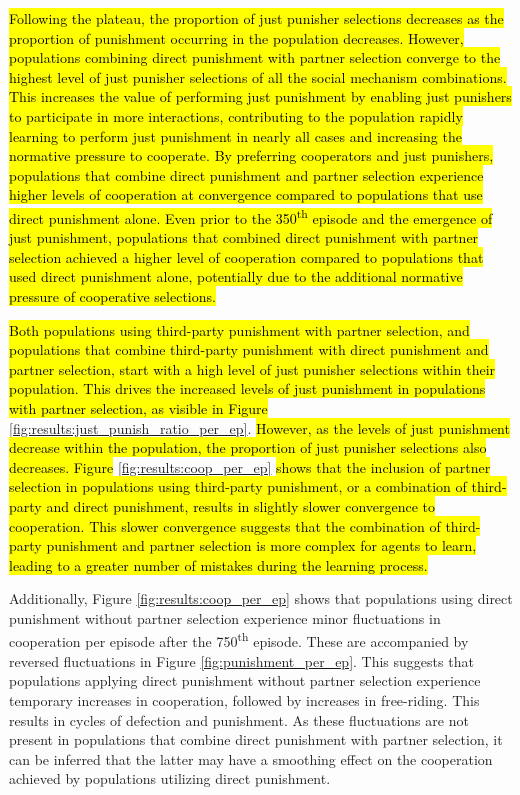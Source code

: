 \documentclass[sn-aps,numbered]{sn-jnl}%
\theoremstyle{thmstyleone}%
\theoremstyle{thmstyletwo}%
\theoremstyle{thmstylethree}%
\begin{document}
\hl{Following the plateau, the proportion of just punisher selections decreases as the proportion of punishment occurring in the population decreases. However, populations combining direct punishment with partner selection converge to the highest level of just punisher selections of all the social mechanism combinations. This increases the value of performing just punishment by enabling just punishers to participate in more interactions, contributing to the population rapidly learning to perform just punishment in nearly all cases and increasing the normative pressure to cooperate. By preferring cooperators and just punishers, populations that combine direct punishment and partner selection experience higher levels of cooperation at convergence compared to populations that use direct punishment alone. Even prior to the 350\textsuperscript{th} episode and the emergence of just punishment, populations that combined direct punishment with partner selection achieved a higher level of cooperation compared to populations that used direct punishment alone, potentially due to the additional normative pressure of cooperative selections.} 

\hl{Both populations using third-party punishment with partner selection, and populations that combine third-party punishment with direct punishment and partner selection, start with a high level of just punisher selections within their population. This drives the increased levels of just punishment in populations with partner selection, as visible in Figure} \ref{fig:results:just_punish_ratio_per_ep}. \hl{However, as the levels of just punishment decrease within the population, the proportion of just punisher selections also decreases. Figure} \ref{fig:results:coop_per_ep} \hl{shows that the inclusion of partner selection in populations using third-party punishment, or a combination of third-party and direct punishment, results in slightly slower convergence to cooperation. This slower convergence suggests that the combination of third-party punishment and partner selection is more complex for agents to learn, leading to a greater number of mistakes during the learning process.}

Additionally, Figure \ref{fig:results:coop_per_ep} shows that populations using direct punishment without partner selection experience minor fluctuations in cooperation per episode after the 750\textsuperscript{th} episode. These are accompanied by reversed fluctuations in Figure \ref{fig:punishment_per_ep}. This suggests that populations applying direct punishment without partner selection experience temporary increases in cooperation, followed by increases in free-riding. This results in cycles of defection and punishment. As these fluctuations are not present in populations that combine direct punishment with partner selection, it can be inferred that the latter may have a smoothing effect on the cooperation achieved by populations utilizing direct punishment.
\end{document}
